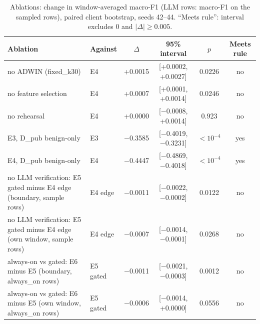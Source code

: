 \begin{table}[t]
\centering
\caption{Ablations: change in window-averaged macro-F1 (LLM rows: macro-F1 on the sampled rows), paired client bootstrap, seeds 42--44. ``Meets rule'': interval excludes 0 and $|\Delta| \geq 0.005$.}
\label{tab:ablation}
\begin{tabular}{llcccc}
\toprule
Ablation & Against & $\Delta$ & 95\% interval & $p$ & Meets rule \\
\midrule
no ADWIN (fixed\_k30) & E4 & +0.0015 & [+0.0002, +0.0027] & 0.0226 & no \\
no feature selection & E4 & +0.0007 & [+0.0001, +0.0014] & 0.0246 & no \\
no rehearsal & E4 & +0.0000 & [$-$0.0008, +0.0014] & 0.923 & no \\
E3, D\_pub benign-only & E3 & $-$0.3585 & [$-$0.4019, $-$0.3231] & $<10^{-4}$ & yes \\
E4, D\_pub benign-only & E4 & $-$0.4447 & [$-$0.4869, $-$0.4018] & $<10^{-4}$ & yes \\
no LLM verification: E5 gated minus E4 edge (boundary, sample rows) & E4 edge & $-$0.0011 & [$-$0.0022, $-$0.0002] & 0.0122 & no \\
no LLM verification: E5 gated minus E4 edge (own window, sample rows) & E4 edge & $-$0.0007 & [$-$0.0014, $-$0.0001] & 0.0268 & no \\
always-on vs gated: E6 minus E5 (boundary, always\_on rows) & E5 gated & $-$0.0011 & [$-$0.0021, $-$0.0003] & 0.0012 & no \\
always-on vs gated: E6 minus E5 (own window, always\_on rows) & E5 gated & $-$0.0006 & [$-$0.0014, +0.0000] & 0.0556 & no \\
\bottomrule
\end{tabular}
\end{table}
